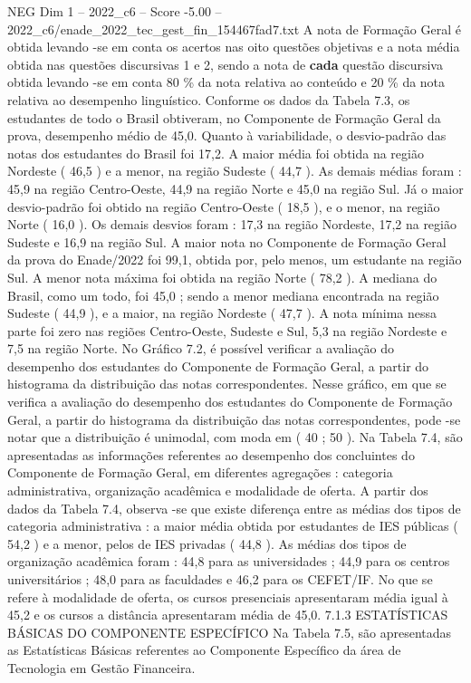 \begin{textsample}{NEG Dim 1 – 2022\_c6 – Score -5.00 – 2022\_c6/enade\_2022\_tec\_gest\_fin\_154467fad7.txt}
A nota de Formação Geral é obtida levando -se em conta os acertos nas oito questões objetivas e a nota média obtida nas questões discursivas 1 e 2, sendo a nota de \textbf{cada} questão discursiva obtida levando -se em conta 80 \% da nota relativa ao conteúdo e 20 \% da nota relativa ao desempenho linguístico.
Conforme os dados da Tabela 7.3, os estudantes de todo o Brasil obtiveram, no Componente de Formação Geral da prova, desempenho médio de 45,0.
Quanto à variabilidade, o desvio-padrão das notas dos estudantes do Brasil foi 17,2.
A maior média foi obtida na região Nordeste ( 46,5 ) e a menor, na região Sudeste ( 44,7 ).
As demais médias foram : 45,9 na região Centro-Oeste, 44,9 na região Norte e 45,0 na região Sul.
Já o maior desvio-padrão foi obtido na região Centro-Oeste ( 18,5 ), e o menor, na região Norte ( 16,0 ).
Os demais desvios foram : 17,3 na região Nordeste, 17,2 na região Sudeste e 16,9 na região Sul.
A maior nota no Componente de Formação Geral da prova do Enade/2022 foi 99,1, obtida por, pelo menos, um estudante na região Sul.
A menor nota máxima foi obtida na região Norte ( 78,2 ).
A mediana do Brasil, como um todo, foi 45,0 ; sendo a menor mediana encontrada na região Sudeste ( 44,9 ), e a maior, na região Nordeste ( 47,7 ).
A nota mínima nessa parte foi zero nas regiões Centro-Oeste, Sudeste e Sul, 5,3 na região Nordeste e 7,5 na região Norte.
No Gráfico 7.2, é possível verificar a avaliação do desempenho dos estudantes do Componente de Formação Geral, a partir do histograma da distribuição das notas correspondentes.
Nesse gráfico, em que se verifica a avaliação do desempenho dos estudantes do Componente de Formação Geral, a partir do histograma da distribuição das notas correspondentes, pode -se notar que a distribuição é unimodal, com moda em ( 40 ; 50 ).
Na Tabela 7.4, são apresentadas as informações referentes ao desempenho dos concluintes do Componente de Formação Geral, em diferentes agregações : categoria administrativa, organização acadêmica e modalidade de oferta.
A partir dos dados da Tabela 7.4, observa -se que existe diferença entre as médias dos tipos de categoria administrativa : a maior média obtida por estudantes de IES públicas ( 54,2 ) e a menor, pelos de IES privadas ( 44,8 ).
As médias dos tipos de organização acadêmica foram : 44,8 para as universidades ; 44,9 para os centros universitários ; 48,0 para as faculdades e 46,2 para os CEFET/IF.
No que se refere à modalidade de oferta, os cursos presenciais apresentaram média igual à 45,2 e os cursos a distância apresentaram média de 45,0. 7.1.3 ESTATÍSTICAS BÁSICAS DO COMPONENTE ESPECÍFICO Na Tabela 7.5, são apresentadas as Estatísticas Básicas referentes ao Componente Específico da área de Tecnologia em Gestão Financeira.

\end{textsample}
